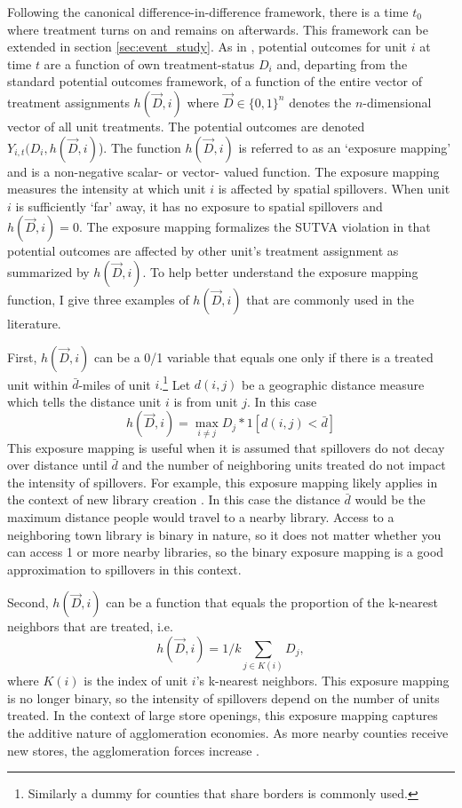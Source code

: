 \documentclass[11pt]{article}
\begin{document}
Following the canonical difference-in-difference framework, there is a time $t_0$ where treatment turns on and remains on afterwards. This framework can be extended in section \ref{sec:event_study}. As in \citet{Vazquez-Bare_2019}, potential outcomes for unit $i$ at time $t$ are a function of own treatment-status $D_i$ and, departing from the standard potential outcomes framework, of a function of the entire vector of treatment assignments $h(\vec{D}, i)$ where $\vec{D} \in \{0,1 \}^n$ denotes the $n$-dimensional vector of all unit treatments. The potential outcomes are denoted $Y_{i,t}(D_i, h(\vec{D}, i)$). The function $h(\vec{D}, i)$ is referred to as an `exposure mapping' and is a non-negative scalar- or vector- valued function. The exposure mapping measures the intensity at which unit $i$ is affected by spatial spillovers. When unit $i$ is sufficiently `far' away, it has no exposure to spatial spillovers and $h(\vec{D}, i) = 0$. The exposure mapping formalizes the SUTVA violation in that potential outcomes are affected by other unit's treatment assignment as summarized by $h(\vec{D}, i)$. To help better understand the exposure mapping function, I give three examples of $h(\vec{D}, i)$ that are commonly used in the literature.

First, $h(\vec{D}, i)$ can be a 0/1 variable that equals one only if there is a treated unit within $\bar{d}$-miles of unit $i$.\footnote{Similarly a dummy for counties that share borders is commonly used.} Let $d(i,j)$ be a geographic distance measure which tells the distance unit $i$ is from unit $j$.  In this case \begin{equation}\label{eq:h_within}
    h(\vec{D}, i) = \max_{i \neq j} D_j * 1[ d(i,j) < \bar{d} ] 
\end{equation}
This exposure mapping is useful when it is assumed that spillovers do not decay over distance until $\bar{d}$ and the number of neighboring units treated do not impact the intensity of spillovers. For example, this exposure mapping likely applies in the context of new library creation \citep{Berkes_Nencka_2020}. In this case the distance $\bar{d}$ would be the maximum distance people would travel to a nearby library. Access to a neighboring town library is binary in nature, so it does not matter whether you can access 1 or more nearby libraries, so the binary exposure mapping is a good approximation to spillovers in this context.  

Second, $h(\vec{D}, i)$ can be a function that equals the proportion of the k-nearest neighbors that are treated, i.e. \begin{equation}\label{eq:h_within}
    h(\vec{D}, i) = 1/k \sum_{j \in K(i)} D_j,
\end{equation}
where $K(i)$ is the index of unit $i$'s k-nearest neighbors. This exposure mapping is no longer binary, so the intensity of spillovers depend on the number of units treated. In the context of large store openings, this exposure mapping captures the additive nature of agglomeration economies. As more nearby counties receive new stores, the agglomeration forces increase \citep{Basker_2005}.
\end{document}
